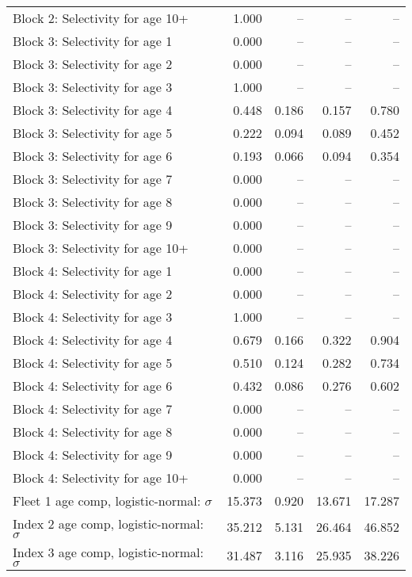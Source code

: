\documentclass[
]{article}
\begin{document}
\begin{landscape}
\begin{longtable}[t]{lrrrr}
Block 2: Selectivity for age 10+ & 1.000 & -- & -- & --\\
Block 3: Selectivity for age 1 & 0.000 & -- & -- & --\\
Block 3: Selectivity for age 2 & 0.000 & -- & -- & --\\
Block 3: Selectivity for age 3 & 1.000 & -- & -- & --\\
\addlinespace
Block 3: Selectivity for age 4 & 0.448 & 0.186 & 0.157 & 0.780\\
Block 3: Selectivity for age 5 & 0.222 & 0.094 & 0.089 & 0.452\\
Block 3: Selectivity for age 6 & 0.193 & 0.066 & 0.094 & 0.354\\
Block 3: Selectivity for age 7 & 0.000 & -- & -- & --\\
Block 3: Selectivity for age 8 & 0.000 & -- & -- & --\\
\addlinespace
Block 3: Selectivity for age 9 & 0.000 & -- & -- & --\\
Block 3: Selectivity for age 10+ & 0.000 & -- & -- & --\\
Block 4: Selectivity for age 1 & 0.000 & -- & -- & --\\
Block 4: Selectivity for age 2 & 0.000 & -- & -- & --\\
Block 4: Selectivity for age 3 & 1.000 & -- & -- & --\\
\addlinespace
Block 4: Selectivity for age 4 & 0.679 & 0.166 & 0.322 & 0.904\\
Block 4: Selectivity for age 5 & 0.510 & 0.124 & 0.282 & 0.734\\
Block 4: Selectivity for age 6 & 0.432 & 0.086 & 0.276 & 0.602\\
Block 4: Selectivity for age 7 & 0.000 & -- & -- & --\\
Block 4: Selectivity for age 8 & 0.000 & -- & -- & --\\
\addlinespace
Block 4: Selectivity for age 9 & 0.000 & -- & -- & --\\
Block 4: Selectivity for age 10+ & 0.000 & -- & -- & --\\
Fleet 1 age comp, logistic-normal: $\sigma$ & 15.373 & 0.920 & 13.671 & 17.287\\
Index 2 age comp, logistic-normal: $\sigma$ & 35.212 & 5.131 & 26.464 & 46.852\\
Index 3 age comp, logistic-normal: $\sigma$ & 31.487 & 3.116 & 25.935 & 38.226\\*
\end{longtable}
\end{landscape}
\end{document}
